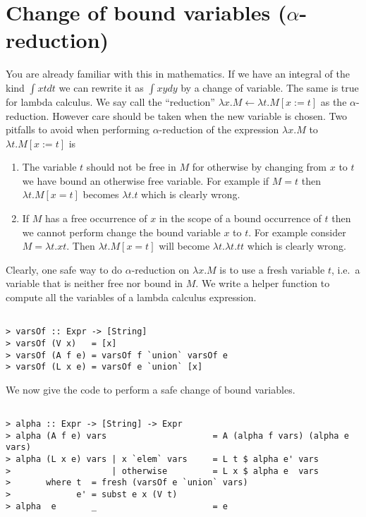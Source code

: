 \documentclass{article}
\begin{document}
\section{Change of bound variables ($\alpha$-reduction)}

You are already familiar with this in mathematics. If we have an
integral of the kind $\int x t dt$ we can rewrite it as $\int x y dy$ by
a change of variable. The same is true for lambda calculus. We say call
the ``reduction'' $\lambda x .M \leftarrow \lambda t. M [x :=t]$ as the
$\alpha$-reduction. However care should be taken when the new variable
is chosen. Two pitfalls to avoid when performing $\alpha$-reduction of
the expression $\lambda x. M$ to $\lambda t. M[x := t]$ is

\begin{enumerate}[1.]
\item
  The variable $t$ should not be free in $M$ for otherwise by changing
  from $x$ to $t$ we have bound an otherwise free variable. For example
  if $M=t$ then $\lambda t. M[x=t]$ becomes $\lambda t.t$ which is
  clearly wrong.
\item
  If $M$ has a free occurrence of $x$ in the scope of a bound occurrence
  of $t$ then we cannot perform change the bound variable $x$ to $t$.
  For example consider $M = \lambda t. x t$. Then $\lambda t. M[x=t]$
  will become $\lambda t. \lambda t. t t$ which is clearly wrong.
\end{enumerate}
Clearly, one safe way to do $\alpha$-reduction on $\lambda x. M$ is to
use a fresh variable $t$, i.e.~a variable that is neither free nor bound
in $M$. We write a helper function to compute all the variables of a
lambda calculus expression.

\begin{verbatim}

> varsOf :: Expr -> [String]
> varsOf (V x)   = [x]
> varsOf (A f e) = varsOf f `union` varsOf e
> varsOf (L x e) = varsOf e `union` [x]
\end{verbatim}
We now give the code to perform a safe change of bound variables.

\begin{verbatim}

> alpha :: Expr -> [String] -> Expr
> alpha (A f e) vars                     = A (alpha f vars) (alpha e vars)
> alpha (L x e) vars | x `elem` vars     = L t $ alpha e' vars
>                    | otherwise         = L x $ alpha e  vars
>       where t  = fresh (varsOf e `union` vars)
>             e' = subst e x (V t)
> alpha  e       _                       = e
\end{verbatim}
\end{document}
